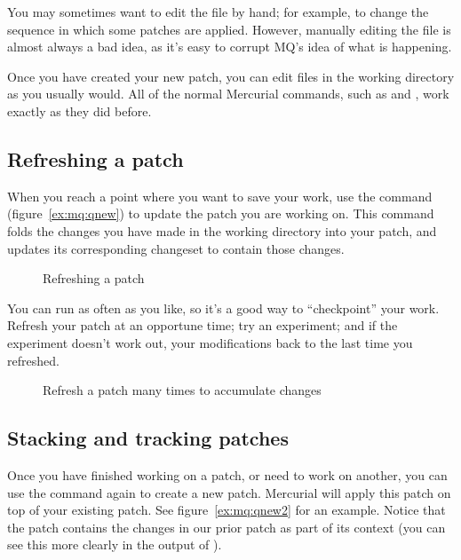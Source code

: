 \begin{note}
  You may sometimes want to edit the  file by hand;
  for example, to change the sequence in which some patches are
  applied.  However, manually editing the  file is
  almost always a bad idea, as it's easy to corrupt MQ's idea of what
  is happening.
\end{note}

Once you have created your new patch, you can edit files in the
working directory as you usually would.  All of the normal Mercurial
commands, such as  and , work exactly as
they did before.
\subsection{Refreshing a patch}

When you reach a point where you want to save your work, use the
 command (figure~\ref{ex:mq:qnew}) to update the patch
you are working on.  This command folds the changes you have made in
the working directory into your patch, and updates its corresponding
changeset to contain those changes.

\begin{figure}[ht]
  \caption{Refreshing a patch}
  \label{ex:mq:qrefresh}
\end{figure}

You can run  as often as you like, so it's a good way
to ``checkpoint'' your work.  Refresh your patch at an opportune
time; try an experiment; and if the experiment doesn't work out,
 your modifications back to the last time you refreshed.

\begin{figure}[ht]
  \caption{Refresh a patch many times to accumulate changes}
  \label{ex:mq:qrefresh2}
\end{figure}

\subsection{Stacking and tracking patches}

Once you have finished working on a patch, or need to work on another,
you can use the  command again to create a new patch.
Mercurial will apply this patch on top of your existing patch.  See
figure~\ref{ex:mq:qnew2} for an example.  Notice that the patch
contains the changes in our prior patch as part of its context (you
can see this more clearly in the output of ).

